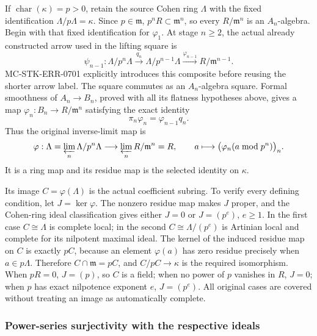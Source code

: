 If \(\operatorname{char}(\kappa)=p>0\), retain the source Cohen ring \(\Lambda\) with the fixed identification \(\Lambda/p\Lambda=\kappa\). Since \(p\in\mathfrak m\), \(p^nR\subset\mathfrak m^n\), so every \(R/\mathfrak m^n\) is an \(A_n\)-algebra. Begin with that fixed identification for \(\varphi_1\). At stage \(n\geq2\), the actual already constructed arrow used in the lifting square is \[
 \psi_{n-1}:
 \Lambda/p^n\Lambda
 \xrightarrow{q_n}\Lambda/p^{n-1}\Lambda
 \xrightarrow{\varphi_{n-1}}R/\mathfrak m^{n-1}.
\] MC-\AlgebraIdentifierBreak{}STK-\AlgebraIdentifierBreak{}ERR-\AlgebraIdentifierBreak{}0701 explicitly introduces this composite before reusing the shorter arrow label. The square commutes as an \(A_n\)-algebra square. Formal smoothness of \(A_n\to B_n\), proved with all its flatness hypotheses above, gives a map \(\varphi_n:B_n\to R/\mathfrak m^n\) satisfying the exact identity \[
 \pi_n\varphi_n=\varphi_{n-1}q_n.
\] Thus the original inverse-limit map is \[
 \varphi:\Lambda=\varprojlim_n\Lambda/p^n\Lambda
       \longrightarrow\varprojlim_n R/\mathfrak m^n=R,\qquad
 a\longmapsto\bigl(\varphi_n(a\bmod p^n)\bigr)_n.
\] It is a ring map and its residue map is the selected identity on \(\kappa\).

Its image \(C=\varphi(\Lambda)\) is the actual coefficient subring. To verify every defining condition, let \(J=\ker\varphi\). The nonzero residue map makes \(J\) proper, and the Cohen-ring ideal classification gives either \(J=0\) or \(J=(p^e)\), \(e\geq1\). In the first case \(C\cong\Lambda\) is complete local; in the second \(C\cong\Lambda/(p^e)\) is Artinian local and complete for its nilpotent maximal ideal. The kernel of the induced residue map on \(C\) is exactly \(pC\), because an element \(\varphi(a)\) has zero residue precisely when \(a\in p\Lambda\). Therefore \(C\cap\mathfrak m=pC\), and \(C/pC\to\kappa\) is the required isomorphism. When \(pR=0\), \(J=(p)\), so \(C\) is a field; when no power of \(p\) vanishes in \(R\), \(J=0\); when \(p\) has exact nilpotence exponent \(e\), \(J=(p^e)\). All original cases are covered without treating an image as automatically complete.

\subsubsection{Power-series surjectivity with the respective ideals}\label{algebra-proof-065-power-series-surjectivity-with-the-respective-ideals}

